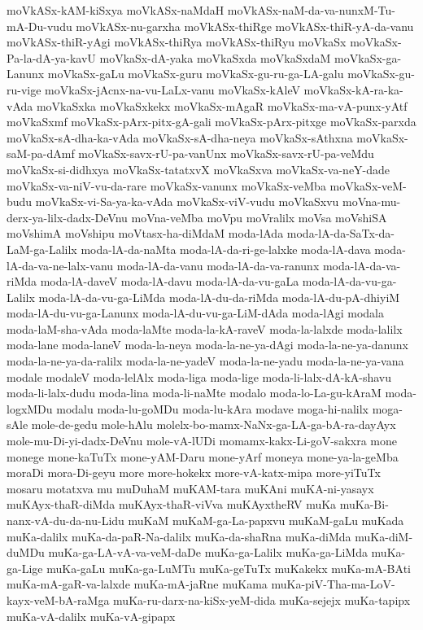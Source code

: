 {moVkASx-kAM-kiSxya
moVkASx-naMdaH
moVkASx-naM-da-va-nunxM-Tu-mA-Du-vudu
moVkASx-nu-garxha
moVkASx-thiRge
moVkASx-thiR-yA-da-vanu
moVkASx-thiR-yAgi
moVkASx-thiRya
moVkASx-thiRyu
moVkaSx
moVkaSx-Pa-la-dA-ya-kavU
moVkaSx-dA-yaka
moVkaSxda
moVkaSxdaM
moVkaSx-ga-Lanunx
moVkaSx-gaLu
moVkaSx-guru
moVkaSx-gu-ru-ga-LA-galu
moVkaSx-gu-ru-vige
moVkaSx-jAcnx-na-vu-LaLx-vanu
moVkaSx-kAleV
moVkaSx-kA-ra-ka-vAda
moVkaSxka
moVkaSxkekx
moVkaSx-mAgaR
moVkaSx-ma-vA-punx-yAtf
moVkaSxmf
moVkaSx-pArx-pitx-gA-gali
moVkaSx-pArx-pitxge
moVkaSx-parxda
moVkaSx-sA-dha-ka-vAda
moVkaSx-sA-dha-neya
moVkaSx-sAthxna
moVkaSx-saM-pa-dAmf
moVkaSx-savx-rU-pa-vanUnx
moVkaSx-savx-rU-pa-veMdu
moVkaSx-si-didhxya
moVkaSx-tatatxvX
moVkaSxva
moVkaSx-va-neY-dade
moVkaSx-va-niV-vu-da-rare
moVkaSx-vanunx
moVkaSx-veMba
moVkaSx-veM-budu
moVkaSx-vi-Sa-ya-ka-vAda
moVkaSx-viV-vudu
moVkaSxvu
moVna-mu-derx-ya-lilx-dadx-DeVnu
moVna-veMba
moVpu
moVralilx
moVsa
moVshiSA
moVshimA
moVshipu
moVtasx-ha-diMdaM
moda-lAda
moda-lA-da-SaTx-da-LaM-ga-Lalilx
moda-lA-da-naMta
moda-lA-da-ri-ge-lalxke
moda-lA-dava
moda-lA-da-va-ne-lalx-vanu
moda-lA-da-vanu
moda-lA-da-va-ranunx
moda-lA-da-va-riMda
moda-lA-daveV
moda-lA-davu
moda-lA-da-vu-gaLa
moda-lA-da-vu-ga-Lalilx
moda-lA-da-vu-ga-LiMda
moda-lA-du-da-riMda
moda-lA-du-pA-dhiyiM
moda-lA-du-vu-ga-Lanunx
moda-lA-du-vu-ga-LiM-dAda
moda-lAgi
modala
moda-laM-sha-vAda
moda-laMte
moda-la-kA-raveV
moda-la-lalxde
moda-lalilx
moda-lane
moda-laneV
moda-la-neya
moda-la-ne-ya-dAgi
moda-la-ne-ya-danunx
moda-la-ne-ya-da-ralilx
moda-la-ne-yadeV
moda-la-ne-yadu
moda-la-ne-ya-vana
modale
modaleV
moda-lelAlx
moda-liga
moda-lige
moda-li-lalx-dA-kA-shavu
moda-li-lalx-dudu
moda-lina
moda-li-naMte
modalo
moda-lo-La-gu-kAraM
moda-logxMDu
modalu
moda-lu-goMDu
moda-lu-kAra
modave
moga-hi-nalilx
moga-sAle
mole-de-gedu
mole-hAlu
molelx-bo-mamx-NaNx-ga-LA-ga-bA-ra-dayAyx
mole-mu-Di-yi-dadx-DeVnu
mole-vA-lUDi
momamx-kakx-Li-goV-sakxra
mone
monege
mone-kaTuTx
mone-yAM-Daru
mone-yArf
moneya
mone-ya-la-geMba
moraDi
mora-Di-geyu
more
more-hokekx
more-vA-katx-mipa
more-yiTuTx
mosaru
motatxva
mu
muDuhaM
muKAM-tara
muKAni
muKA-ni-yasayx
muKAyx-thaR-diMda
muKAyx-thaR-viVva
muKAyxtheRV
muKa
muKa-Bi-nanx-vA-du-da-nu-Lidu
muKaM
muKaM-ga-La-papxvu
muKaM-gaLu
muKada
muKa-dalilx
muKa-da-paR-Na-dalilx
muKa-da-shaRna
muKa-diMda
muKa-diM-duMDu
muKa-ga-LA-vA-va-veM-daDe
muKa-ga-Lalilx
muKa-ga-LiMda
muKa-ga-Lige
muKa-gaLu
muKa-ga-LuMTu
muKa-geTuTx
muKakekx
muKa-mA-BAti
muKa-mA-gaR-va-lalxde
muKa-mA-jaRne
muKama
muKa-piV-Tha-ma-LoV-kayx-veM-bA-raMga
muKa-ru-darx-na-kiSx-yeM-dida
muKa-sejejx
muKa-tapipx
muKa-vA-dalilx
muKa-vA-gipapx
}
